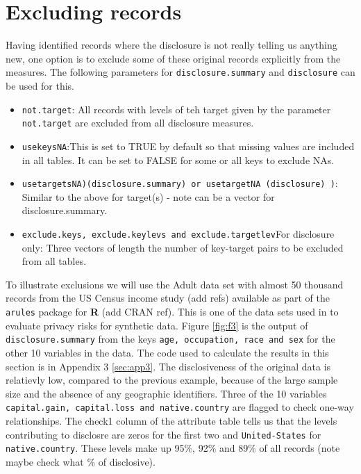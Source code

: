 \documentclass[12pt]{article}
\begin{document}
\section{Excluding records}\label{sec:exclusions}
Having identified records where the disclosure is not really telling us anything new, one option is to  exclude some of these original records explicitly from the measures. The following parameters 
for \texttt{disclosure.summary} and \texttt{disclosure} can be used for this.
\begin{itemize}
\item{\texttt{not.target}: All records with levels of teh target given by the parameter \texttt{not.target} are excluded from all disclosure measures.}
\item{\texttt{usekeysNA}:This is set to TRUE by default so that missing values are included in all tables. It can be set to FALSE for some or all keys to exclude NAs.}
\item{\texttt{usetargetsNA)(disclosure.summary) or usetargetNA (disclosure) )}: Similar to the above for target(s) - note can be a vector for disclosure.summary.}
\item{\texttt{exclude.keys, exclude.keylevs and exclude.targetlev}For disclosure only: Three vectors of length the number of key-target pairs to be excluded from all tables.}
\end{itemize}
To illustrate exclusions we will use the Adult data set with almost 50 thousand records from the US Census income study (add refs) available as part of the \texttt{arules} package for \textbf{R} (add CRAN ref). This is one of the data sets used in \cite{giomi2022anon} to evaluate privacy risks for synthetic data. Figure \ref{fig:f3} is the output of \texttt{disclosure.summary} from the keys \texttt{age, occupation, race and sex} for the other 10 variables in the data. The code used to calculate the results in this section is in Appendix 3 \ref{sec:app3}.
The disclosiveness of the original data is relatievly low, compared to the previous example, because of the large sample size and the absence of any geographic identifiers. 
Three of the 10 variables \texttt{capital.gain, capital.loss and native.country} are flagged to check one-way relationships. The check1 column of the attribute table tells us that the levels contributing to disclosre are
zeros for the first two and \texttt{United-States} for \texttt{native.country}. These levels make up 95\%, 92\% and 89\% of all records (note maybe check what \% of disclosive).
\end{document}
